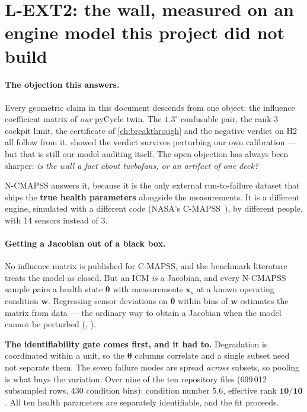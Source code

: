 \section{L-EXT2: the wall, measured on an engine model this project did not build}
\label{sec:f20-ncmapss}

\paragraph{The objection this answers.} Every geometric claim in this document descends from one
object: the influence coefficient matrix of \emph{our} pyCycle twin. The $1.3^{\circ}$
confusable pair, the rank-3 cockpit limit, the certificate of \cref{ch:breakthrough} and the
negative verdict on H2 all follow from it.  showed the verdict survives
perturbing our own calibration --- but that is still our model auditing itself. The open
objection has always been sharper: \emph{is the wall a fact about turbofans, or an artifact of
one deck?}

N-CMAPSS answers it, because it is the only external run-to-failure dataset that ships the
\textbf{true health parameters} alongside the measurements. It is a different engine, simulated
with a different code (NASA's C-MAPSS~\cite{AriasChao2021}), by different people, with 14
sensors instead of 3.

\paragraph{Getting a Jacobian out of a black box.} No influence matrix is published for
C-MAPSS, and the benchmark literature treats the model as closed. But an ICM \emph{is} a
Jacobian, and every N-CMAPSS sample pairs a health state $\boldsymbol{\theta}$ with
measurements $\mathbf{x}_s$ at a known operating condition $\mathbf{w}$. Regressing sensor
deviations on $\boldsymbol{\theta}$ within bins of $\mathbf{w}$ estimates the matrix from data
--- the ordinary way to obtain a Jacobian when the model cannot be perturbed
(, ).

\textbf{The identifiability gate comes first, and it had to.} Degradation is coordinated within
a unit, so the $\boldsymbol{\theta}$ columns correlate and a single subset need not separate
them. The seven failure modes are spread \emph{across} subsets, so pooling is what buys the
variation. Over nine of the ten repository files (699\,012 subsampled rows, 430 condition bins):
condition number $\mathbf{5.6}$, effective rank $\mathbf{10/10}$. All ten health parameters are
separately identifiable, and the fit proceeds.

